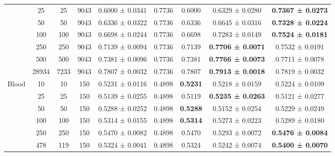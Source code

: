 \begin{table}
{\begin{tabular}[H]{@{}lcccccccc@{}}
                              & 25    & 25   & 9043 & 0.6000 ± 0.0341      & 0.7736                & 0.6000          & 0.6329 ± 0.0280          & \textbf{0.7367 ± 0.0273} \\
                              & 50    & 50   & 9043 & 0.6336 ± 0.0322      & 0.7736                & 0.6336          & 0.6645 ± 0.0316          & \textbf{0.7328 ± 0.0224} \\
                              & 100   & 100  & 9043 & 0.6698 ± 0.0244      & 0.7736                & 0.6698          & 0.7283 ± 0.0149          & \textbf{0.7524 ± 0.0181} \\
                              & 250   & 250  & 9043 & 0.7139 ± 0.0094      & 0.7736                & 0.7139          & \textbf{0.7706 ± 0.0071} & 0.7532 ± 0.0191          \\
                              & 500   & 500  & 9043 & 0.7381 ± 0.0096      & 0.7736                & 0.7381          & \textbf{0.7766 ± 0.0073} & 0.7711 ± 0.0078          \\
                              & 28934 & 7233 & 9043 & 0.7807 ± 0.0032      & 0.7736                & 0.7807          & \textbf{0.7913 ± 0.0018} & 0.7819 ± 0.0032          \\
                              \midrule
\multirow{6}{*}{Blood}        & 10    & 10   & 150  & 0.5231 ± 0.0116      & 0.4898                & \textbf{0.5231} & 0.5218 ± 0.0159          & 0.5224 ± 0.0109          \\
                              & 25    & 25   & 150  & 0.5139 ± 0.0255      & 0.4898                & 0.5119          & \textbf{0.5235 ± 0.0263} & 0.5121 ± 0.0277          \\
                              & 50    & 50   & 150  & 0.5288 ± 0.0252      & 0.4898                & \textbf{0.5288} & 0.5152 ± 0.0254          & 0.5229 ± 0.0249          \\
                              & 100   & 100  & 150  & 0.5314 ± 0.0155      & 0.4898                & \textbf{0.5314} & 0.5273 ± 0.0223          & 0.5289 ± 0.0180          \\
                              & 250   & 250  & 150  & 0.5470 ± 0.0082      & 0.4898                & 0.5470          & 0.5293 ± 0.0072          & \textbf{0.5476 ± 0.0084} \\
                              & 478   & 119  & 150  & 0.5324 ± 0.0041      & 0.4898                & 0.5324          & 0.5242 ± 0.0074          & \textbf{0.5400 ± 0.0070} \\

\end{tabular}}
\end{table}
